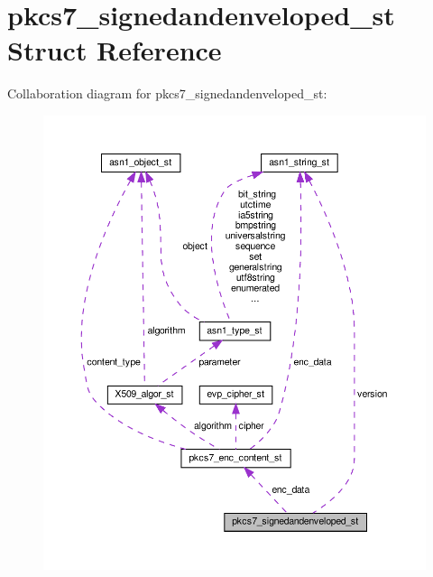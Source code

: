 \hypertarget{structpkcs7__signedandenveloped__st}{}\section{pkcs7\+\_\+signedandenveloped\+\_\+st Struct Reference}
\label{structpkcs7__signedandenveloped__st}


Collaboration diagram for pkcs7\+\_\+signedandenveloped\+\_\+st\+:
\nopagebreak
\begin{figure}[H]
\begin{center}
\leavevmode
\includegraphics[width=350pt]{structpkcs7__signedandenveloped__st__coll__graph}
\end{center}
\end{figure}
